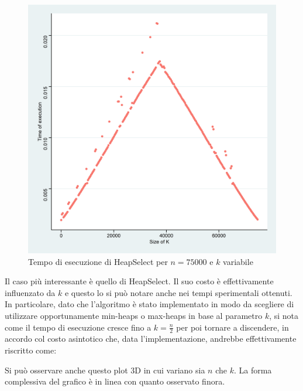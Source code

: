\documentclass{article}
\begin{document}
	\begin{figure}[h!]
  		\includegraphics[width=\linewidth]{images/HeapSelect_Kvariable.png}
  		\caption{Tempo di esecuzione di HeapSelect per $n=75000$ e $k$ variabile}
  		\label{fig:graph4}
	\end{figure}
	
Il caso più interessante è quello di HeapSelect. Il suo costo è effettivamente influenzato da $k$ e questo lo si può notare anche nei tempi sperimentali ottenuti. In particolare, dato che l'algoritmo è stato implementato in modo da scegliere di utilizzare opportunamente min-heaps o max-heaps in base al parametro $k$, si nota come il tempo di esecuzione cresce fino a $k=\frac{n}{2}$ per poi tornare a discendere, in accordo col costo asintotico che, data l'implementazione, andrebbe effettivamente riscritto come:
	
	
	\newpage
	Si può osservare anche questo plot 3D in cui variano sia $n$ che $k$. La forma complessiva del grafico è in linea con quanto osservato finora.
	
\end{document}
